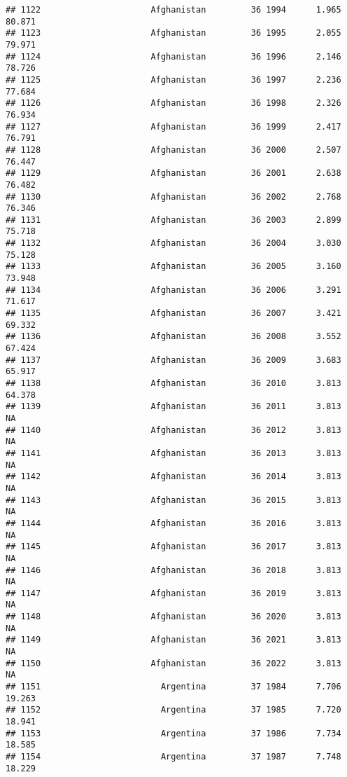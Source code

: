 \documentclass[
]{article}
\begin{document}
\begin{verbatim}
## 1122                      Afghanistan         36 1994      1.965     80.871
## 1123                      Afghanistan         36 1995      2.055     79.971
## 1124                      Afghanistan         36 1996      2.146     78.726
## 1125                      Afghanistan         36 1997      2.236     77.684
## 1126                      Afghanistan         36 1998      2.326     76.934
## 1127                      Afghanistan         36 1999      2.417     76.791
## 1128                      Afghanistan         36 2000      2.507     76.447
## 1129                      Afghanistan         36 2001      2.638     76.482
## 1130                      Afghanistan         36 2002      2.768     76.346
## 1131                      Afghanistan         36 2003      2.899     75.718
## 1132                      Afghanistan         36 2004      3.030     75.128
## 1133                      Afghanistan         36 2005      3.160     73.948
## 1134                      Afghanistan         36 2006      3.291     71.617
## 1135                      Afghanistan         36 2007      3.421     69.332
## 1136                      Afghanistan         36 2008      3.552     67.424
## 1137                      Afghanistan         36 2009      3.683     65.917
## 1138                      Afghanistan         36 2010      3.813     64.378
## 1139                      Afghanistan         36 2011      3.813         NA
## 1140                      Afghanistan         36 2012      3.813         NA
## 1141                      Afghanistan         36 2013      3.813         NA
## 1142                      Afghanistan         36 2014      3.813         NA
## 1143                      Afghanistan         36 2015      3.813         NA
## 1144                      Afghanistan         36 2016      3.813         NA
## 1145                      Afghanistan         36 2017      3.813         NA
## 1146                      Afghanistan         36 2018      3.813         NA
## 1147                      Afghanistan         36 2019      3.813         NA
## 1148                      Afghanistan         36 2020      3.813         NA
## 1149                      Afghanistan         36 2021      3.813         NA
## 1150                      Afghanistan         36 2022      3.813         NA
## 1151                        Argentina         37 1984      7.706     19.263
## 1152                        Argentina         37 1985      7.720     18.941
## 1153                        Argentina         37 1986      7.734     18.585
## 1154                        Argentina         37 1987      7.748     18.229

\end{verbatim}
\end{document}
